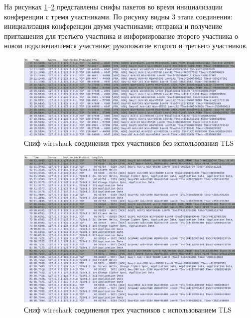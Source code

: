 \clearpage

На рисунках \ref{img:trace-conf-3}--\ref{img:trace-conf-3-tls} представлены снифы пакетов во время инициализации конференции с тремя участниками. По рисунку видны 3 этапа соединения: инициализация конференции двумя участниками; отправка и получение приглашения для третьего участника и информирование второго участника о новом подключившемся участнике; рукопожатие второго и третьего участников.

\begin{figure}[h!]
  \centering
  \includegraphics[width=\linewidth]{inc/img/trace-conf-3.png}
  \caption{Сниф wireshark соединения трех участников без использования TLS}
  \label{img:trace-conf-3}
\end{figure}

\begin{figure}[h!]
  \centering
  \includegraphics[width=\linewidth]{inc/img/trace-conf-3-tls.png}
  \caption{Сниф wireshark соединения трех участников с использованием TLS}
  \label{img:trace-conf-3-tls}
\end{figure}
